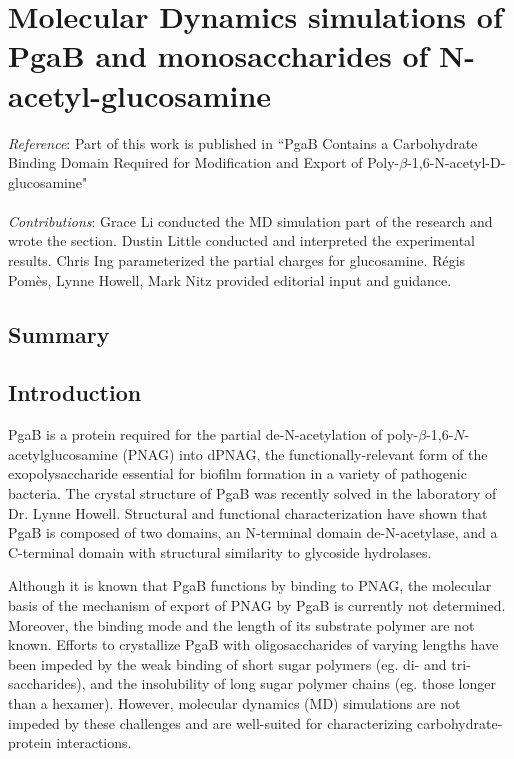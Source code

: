 

\chapter[MD simulations of PgaB-glucosamine binding]{Molecular Dynamics simulations of PgaB and monosaccharides of N-acetyl-glucosamine}

\emph{Reference}: Part of this work is published in ``PgaB Contains a Carbohydrate Binding Domain Required for Modification and Export of Poly-$\beta$-1,6-N-acetyl-D-glucosamine"
\\
\\
\emph{Contributions}:
Grace Li conducted the MD simulation part of the research and wrote the section. Dustin Little conducted and interpreted the experimental results. Chris Ing parameterized the partial charges for glucosamine. R\'{e}gis Pom\`{e}s, Lynne Howell, Mark Nitz provided editorial input and guidance.

\newpage

\section{Summary}

\section{Introduction}


PgaB is a protein required for the partial de-N-acetylation of poly-$\beta$-1,6-$N$-acetylglucosamine (PNAG) into dPNAG, the functionally-relevant form of the exopolysaccharide essential for biofilm formation in a variety of pathogenic bacteria. \cite{Little:2012dp} The crystal structure of PgaB was recently solved in the laboratory of Dr. Lynne Howell.\cite{Little:2012dp} Structural and functional characterization have shown that PgaB is composed of two domains, an N-terminal domain de-N-acetylase, and a C-terminal domain with structural similarity to glycoside hydrolases.\cite{Little:2012dp}

Although it is known that PgaB functions by binding to PNAG, the molecular basis of the mechanism of export of PNAG by PgaB is currently not determined.  Moreover, the binding mode and the length of its substrate polymer are not known.
Efforts to crystallize PgaB with oligosaccharides of varying lengths have been impeded by the weak binding of short sugar polymers (eg. di- and tri-saccharides), and the insolubility of long sugar polymer chains (eg. those longer than a hexamer). However, molecular dynamics (MD) simulations are not impeded by these challenges and are well-suited for characterizing carbohydrate-protein interactions.\cite{Fadda:2010p5889}

